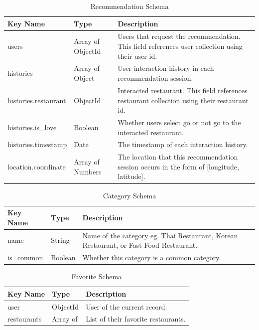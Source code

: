 \documentclass[12pt,oneside,openright,a4paper]{cpe-english-project}
\begin{document}
\begin{table}[H]
\caption{Recommendation Schema}\label{tbl:3RecommendationSchema}
\begin{tabularx}{\textwidth}{l|l|X} \hline\hline
Key Name & Type & Description \\ \hline\hline
users & Array of ObjectId & Users that request the recommendation. This field references user collection using their user id. \\ \hline
histories & Array of Object & User interaction history in each recommendation session. \\ \hline
histories.restaurant & ObjectId & Interacted restaurant. This field references restaurant collection using their restaurant id. \\ \hline
histories.is\_love & Boolean & Whether users select go or not go to the interacted restaurant. \\ \hline
histories.timestamp & Date & The timestamp of each interaction history. \\ \hline
location.coordinate & Array of Numbers & The location that this recommendation session occurs in the form of [longitude, latitude]. \\ \hline\hline
\end{tabularx}
\end{table}

\begin{table}[H]
\caption{Category Schema}\label{tbl:3CategorySchema}
\begin{tabularx}{\textwidth}{l|l|X} \hline\hline
Key Name & Type & Description \\ \hline\hline
name & String & Name of the category eg. Thai Restaurant, Korean Restaurant, or Fast Food Restaurant. \\ \hline
is\_common & Boolean & Whether this category is a common category. \\ \hline\hline
\end{tabularx}
\end{table}

\begin{table}[H]
\caption{Favorite Schema}\label{tbl:3FavoriteSchema}
\begin{tabularx}{\textwidth}{l|l|X} \hline\hline
Key Name & Type & Description \\ \hline\hline
user & ObjectId & User of the current record. \\ \hline
restaurants & Array of & List of their favorite restaurants. \\ \hline\hline
\end{tabularx}
\end{table}
\end{document}
